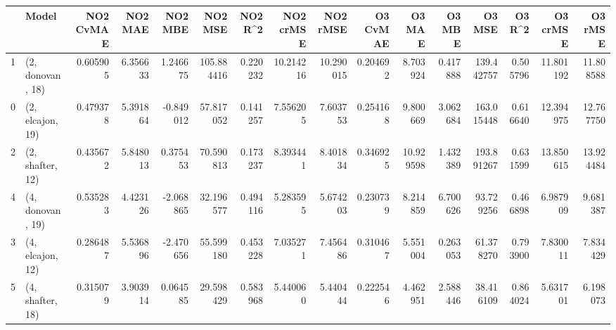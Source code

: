 \begin{tabular}{llrrrrrrrrrrrrrr}
\toprule
{} &             Model &  NO2 CvMAE &   NO2 MAE &   NO2 MBE &     NO2 MSE &   NO2 R\textasciicircum2 &  NO2 crMSE &   NO2 rMSE &  O3 CvMAE &     O3 MAE &    O3 MBE &      O3 MSE &    O3 R\textasciicircum2 &   O3 crMSE &    O3 rMSE \\
\midrule
1 &  (2, donovan, 18) &   0.605905 &  6.356633 &  1.246675 &  105.884416 &  0.220232 &  10.214216 &  10.290015 &  0.204692 &   8.703924 &  0.417888 &  139.442757 &  0.505796 &  11.801192 &  11.808588 \\
0 &  (2, elcajon, 19) &   0.479378 &  5.391864 & -0.849012 &   57.817052 &  0.141257 &   7.556205 &   7.603753 &  0.254168 &   9.800669 &  3.062684 &  163.015448 &  0.616640 &  12.394975 &  12.767750 \\
2 &  (2, shafter, 12) &   0.435672 &  5.848013 &  0.375453 &   70.590813 &  0.173237 &   8.393441 &   8.401834 &  0.346925 &  10.929598 &  1.432389 &  193.891267 &  0.631599 &  13.850615 &  13.924484 \\
4 &  (4, donovan, 19) &   0.535283 &  4.423126 & -2.068865 &   32.196577 &  0.494116 &   5.283595 &   5.674203 &  0.230739 &   8.214859 &  6.700626 &   93.729256 &  0.466898 &   6.987909 &   9.681387 \\
3 &  (4, elcajon, 12) &   0.286487 &  5.536896 & -2.470656 &   55.599180 &  0.453228 &   7.035271 &   7.456486 &  0.310467 &   5.551004 &  0.263053 &   61.378270 &  0.793900 &   7.830011 &   7.834429 \\
5 &  (4, shafter, 18) &   0.315079 &  3.903914 &  0.064585 &   29.598429 &  0.583968 &   5.440060 &   5.440444 &  0.222546 &   4.462951 &  2.588446 &   38.416109 &  0.864024 &   5.631701 &   6.198073 \\
\bottomrule
\end{tabular}
